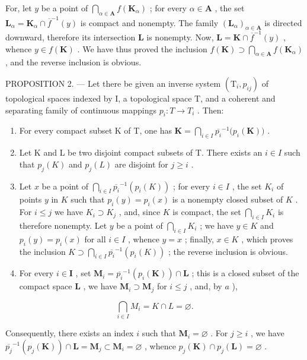 For, let \(y\) be a point of \(\bigcap_{\alpha \in \mathbf{A}} f(\mathbf{K}_{\alpha})\) ; for every \(\alpha \in \mathbf{A}\) , the set \(\mathbf{L}_{\alpha} = \mathbf{K}_{\alpha} \cap \overline{f}^{-1}(y)\) is compact and nonempty. The family \((\mathbf{L}_{\alpha})_{\alpha \in \mathbf{A}}\) is directed downward, therefore its intersection \(\mathbf{L}\) is nonempty. Now, \(\mathbf{L} = \mathbf{K} \cap \overline{f}^{-1}(y)\) , whence \(y \in f(\mathbf{K})\) . We have thus proved the inclusion \(f(\mathbf{K}) \supset \bigcap_{\alpha \in \mathbf{A}} f(\mathbf{K}_{\alpha})\) , and the reverse inclusion is obvious.

PROPOSITION 2. --- Let there be given an inverse system \((\mathrm{T}_{i}, p_{ij})\) of topological spaces indexed by I, a topological space T, and a coherent and separating family of continuous mappings \(p_{i}: T \to T_{i}\) . Then:

\begin{enumerate}
\def\labelenumi{\alph{enumi})}
\item
  For every compact subset K of T, one has \(\mathbf{K} = \bigcap_{i\in I}\overline{p_i}^{-1}\big(p_i(\mathbf{K})\big)\) .
\item
  Let K and L be two disjoint compact subsets of T. There exists an \(i \in I\) such that \(p_{j}(K)\) and \(p_{j}(L)\) are disjoint for \(j \geqslant i\) .
\item
  Let \(x\) be a point of \(\bigcap_{i \in I} \overline{p_i}^{-1}(p_i(K))\) ; for every \(i \in I\) , the set \(K_i\) of points \(y\) in \(K\) such that \(p_i(y) = p_i(x)\) is a nonempty closed subset of \(K\) . For \(i \leqslant j\) we have \(K_i \supset K_j\) , and, since \(K\) is compact, the set \(\bigcap_{i \in I} K_i\) is therefore nonempty. Let \(y\) be a point of \(\bigcap_{i \in I} K_i\) ; we have \(y \in K\) and \(p_i(y) = p_i(x)\) for all \(i \in I\) , whence \(y = x\) ; finally, \(x \in K\) , which proves the inclusion \(K \supset \bigcap_{i \in I} \overline{p_i}^{-1}(p_i(K))\) ; the reverse inclusion is obvious.
\item
  For every \(i \in \mathbf{I}\) , set \(\mathbf{M}_i = \overline{p_i}^{-1}(p_i(\mathbf{K})) \cap \mathbf{L}\) ; this is a closed subset of the compact space \(\mathbf{L}\) , we have \(\mathbf{M}_i \supset \mathbf{M}_j\) for \(i \leqslant j\) , and, by \(a\) ),
\end{enumerate}

\[
\bigcap_ {i \in I} M _ {i} = K \cap L = \varnothing .
\]

Consequently, there exists an index \(i\) such that \(\mathbf{M}_i = \varnothing\) . For \(j \geqslant i\) , we have \(\overline{p_j}^{-1} (p_j(\mathbf{K})) \cap \mathbf{L} = \mathbf{M}_j \subset \mathbf{M}_i = \varnothing\) , whence \(p_j(\mathbf{K}) \cap p_j(\mathbf{L}) = \varnothing\) .
